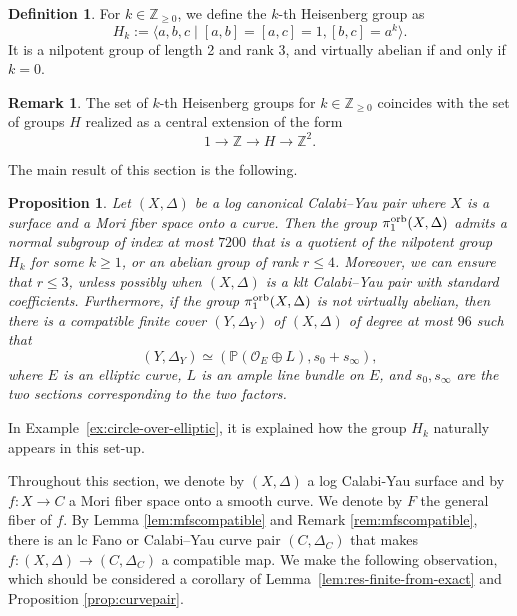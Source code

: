 \documentclass{amsart}
\newcommand{\zz}{\mathbb{Z}}
\newtheorem{proposition}[theorem]{Proposition}
\theoremstyle{definition}
\newtheorem{definition}[theorem]{Definition}
\newtheorem{remark}[theorem]{Remark}
\theoremstyle{remark}
\numberwithin{equation}{section}
\begin{document}
\begin{definition}\label{def:heisenberg}
For $k\in\mathbb{Z}_{\ge 0}$, we define the $k$-th Heisenberg group as
    \[
    H_k:=\langle a,b,c\mid [a,b]=[a,c]=1,[b,c]=a^k\rangle.
    \]
    It is a nilpotent group of length 2 and rank 3, and virtually abelian if and only if $k=0$.
\end{definition}

\begin{remark}
    The set of $k$-th Heisenberg groups for $k\in\mathbb{Z}_{\ge 0}$ coincides with the set of groups $H$ realized as a central extension of the form
    $$1\to \zz\to H\to \zz^2.$$
\end{remark}

The main result of this section is the following.

\begin{proposition}\label{prop:mfs}
Let $(X,\Delta)$ be a log canonical Calabi--Yau pair where $X$ is a surface and a Mori fiber space onto a curve. Then the group $\pi_1^{\rm orb}(X,\Delta)$ admits a normal subgroup of index at most $7200$ that is a quotient of the nilpotent group $H_k$ for some $k\ge 1$, or an abelian group of rank $r\le 4$. Moreover, we can ensure that $r\le 3$, unless possibly when $(X,\Delta)$ is a klt Calabi--Yau pair with standard coefficients. Furthermore, if the group $\pi_1^{\rm orb}(X,\Delta)$ is not virtually abelian, then there is a compatible finite cover $(Y,\Delta_Y)$ of $(X,\Delta)$ of degree at most $96$ such that 
$$(Y,\Delta_Y)\simeq(\mathbb{P}(\mathcal{O}_E\oplus L),s_0+s_{\infty}),$$
where $E$ is an elliptic curve, $L$ is an ample line bundle on $E$, and $s_0,s_{\infty}$ are the two sections corresponding to the two factors.
\end{proposition}

In Example~\ref{ex:circle-over-elliptic}, it is explained how the group $H_k$ naturally appears in this set-up.

\medskip

Throughout this section, we denote by $(X,\Delta)$ a log Calabi-Yau surface and by $f:X\to C$ a Mori fiber space onto a smooth curve. We denote by $F$ the general fiber of $f$. By Lemma \ref{lem:mfscompatible} and Remark \ref{rem:mfscompatible}, there is an lc Fano or Calabi--Yau curve pair $(C,\Delta_C)$ that makes $f:(X,\Delta)\to(C,\Delta_C)$ a compatible map.
We make the following observation, which should be considered a corollary of Lemma~\ref{lem:res-finite-from-exact} and Proposition \ref{prop:curvepair}.
\end{document}
